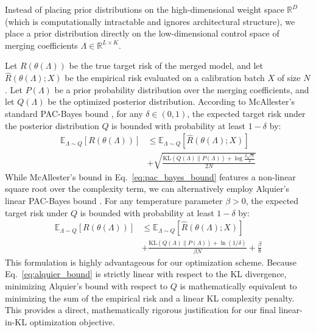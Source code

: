 Instead of placing prior distributions on the high-dimensional weight space
$\mathbb{R}^D$ (which is computationally intractable and ignores architectural
structure), we place a prior distribution directly on the low-dimensional
control space of merging coefficients $\Lambda \in \mathbb{R}^{L \times K}$.

Let $R(\theta(\Lambda))$ be the true target risk of the merged model, and let
$\hat{R}(\theta(\Lambda); X)$ be the empirical risk evaluated on a calibration
batch $X$ of size $N$. Let $P(\Lambda)$ be a prior probability distribution over
the merging coefficients, and let $Q(\Lambda)$ be the optimized posterior
distribution. According to McAllester's standard PAC-Bayes bound
\cite{mcallester1999some}, for any $\delta \in (0, 1)$, the expected target risk
under the posterior distribution $Q$ is bounded with probability at least
$1-\delta$ by:
\begin{equation}
\label{eq:pac_bayes_bound}
\begin{aligned}
\mathbb{E}_{\Lambda \sim Q} [R(\theta(\Lambda))] &\le \mathbb{E}_{\Lambda \sim
Q} [\hat{R}(\theta(\Lambda); X)] \\
&+ \sqrt{\frac{\text{KL}(Q(\Lambda) \| P(\Lambda)) + \log \frac{2\sqrt{N}}{\delta}}{2N}}
\end{aligned}
\end{equation}
While McAllester's bound in Eq.~\ref{eq:pac_bayes_bound} features a non-linear
square root over the complexity term, we can alternatively employ Alquier's
linear PAC-Bayes bound \cite{alquier2016properties}. For any temperature
parameter $\beta > 0$, the expected target risk under $Q$ is bounded with
probability at least $1-\delta$ by:
\begin{equation}
\label{eq:alquier_bound}
\begin{aligned}
\mathbb{E}_{\Lambda \sim Q} [R(\theta(\Lambda))] &\le \mathbb{E}_{\Lambda \sim
Q} [\hat{R}(\theta(\Lambda); X)] \\
&+ \frac{\text{KL}(Q(\Lambda) \| P(\Lambda)) + \ln(1/\delta)}{\beta N} + \frac{\beta}{8}
\end{aligned}
\end{equation}
This formulation is highly advantageous for our optimization scheme. Because
Eq.~\ref{eq:alquier_bound} is strictly linear with respect to the KL divergence,
minimizing Alquier's bound with respect to $Q$ is mathematically equivalent to
minimizing the sum of the empirical risk and a linear KL complexity penalty.
This provides a direct, mathematically rigorous justification for our final
linear-in-KL optimization objective.

